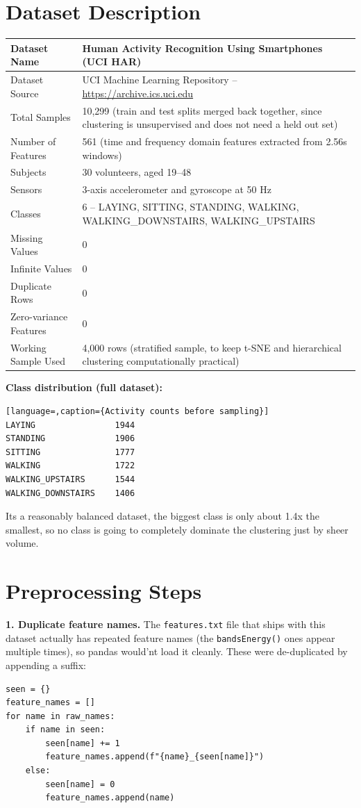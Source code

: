 \documentclass[12pt,a4paper]{article}
\begin{document}
\section{Dataset Description}
\begin{longtable}{|p{5cm}|p{9cm}|}
\hline
Dataset Name & Human Activity Recognition Using Smartphones (UCI HAR) \\ \hline
Dataset Source & UCI Machine Learning Repository -- \url{https://archive.ics.uci.edu} \\ \hline
Total Samples & 10,299 (train and test splits merged back together, since clustering is unsupervised and does not need a held out set) \\ \hline
Number of Features & 561 (time and frequency domain features extracted from 2.56s windows) \\ \hline
Subjects & 30 volunteers, aged 19--48 \\ \hline
Sensors & 3-axis accelerometer and gyroscope at 50 Hz \\ \hline
Classes & 6 -- LAYING, SITTING, STANDING, WALKING, WALKING\_DOWNSTAIRS, WALKING\_UPSTAIRS \\ \hline
Missing Values & 0 \\ \hline
Infinite Values & 0 \\ \hline
Duplicate Rows & 0 \\ \hline
Zero-variance Features & 0 \\ \hline
Working Sample Used & 4,000 rows (stratified sample, to keep t-SNE and hierarchical clustering computationally practical) \\ \hline
\end{longtable}

\textbf{Class distribution (full dataset):}
\begin{lstlisting}[language=,caption={Activity counts before sampling}]
LAYING                1944
STANDING              1906
SITTING               1777
WALKING               1722
WALKING_UPSTAIRS      1544
WALKING_DOWNSTAIRS    1406
\end{lstlisting}
Its a reasonably balanced dataset, the biggest class is only about 1.4x the smallest, so no class is going to completely dominate the clustering just by sheer volume.

\section{Preprocessing Steps}

\textbf{1. Duplicate feature names.} The \texttt{features.txt} file that ships with this dataset actually has repeated feature names (the \texttt{bandsEnergy()} ones appear multiple times), so pandas would'nt load it cleanly. These were de-duplicated by appending a suffix:
\begin{lstlisting}[caption={Handling duplicate feature names}]
seen = {}
feature_names = []
for name in raw_names:
    if name in seen:
        seen[name] += 1
        feature_names.append(f"{name}_{seen[name]}")
    else:
        seen[name] = 0
        feature_names.append(name)
\end{lstlisting}
\end{document}
